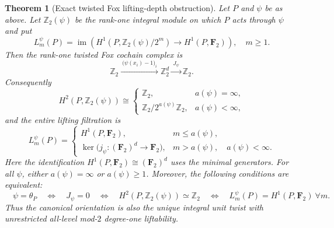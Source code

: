 \documentclass[11pt]{article}
\newtheorem{theorem}{Theorem}[section]
\theoremstyle{definition}
\begin{document}
\begin{theorem}[Exact twisted Fox lifting-depth obstruction]
\label{thm:dyadic-twisted-fox-lifting-depth}
Let $P$ and $\psi$ be as above.  Let
$\mathbb Z_2(\psi)$ be the rank-one integral module
on which $P$ acts through $\psi$ and put
\begin{equation}\label{eq:dyadic-psi-lifting-def}
L_m^\psi(P)=
\operatorname{im}\left(
H^1(P,\mathbb Z_2(\psi)/2^m)
\longrightarrow H^1(P,\mathbf F_2)\right),
\quad m\ge1.
\end{equation}
Then the rank-one twisted Fox cochain complex is
\begin{equation}\label{eq:dyadic-psi-three-term-fox}
\mathbb Z_2
\xrightarrow{\ \bigl(\psi(x_i)-1\bigr)_i\ }
\mathbb Z_2^d
\xrightarrow{\ J_\psi\ }
\mathbb Z_2.
\end{equation}
Consequently
\begin{equation}\label{eq:dyadic-psi-h2}
H^2(P,\mathbb Z_2(\psi))
\cong
\begin{cases}
\mathbb Z_2,&a(\psi)=\infty,\\
\mathbb Z_2/2^{a(\psi)}\mathbb Z_2,
  &a(\psi)<\infty,
\end{cases}
\end{equation}
and the entire lifting filtration is
\begin{equation}\label{eq:dyadic-psi-lifting-formula}
L_m^\psi(P)=
\begin{cases}
H^1(P,\mathbf F_2),
 &m\le a(\psi),\\
\ker\bigl(j_\psi:(\mathbf F_2)^d\to\mathbf F_2\bigr),
 &m>a(\psi),\quad a(\psi)<\infty.
\end{cases}
\end{equation}
Here the identification $H^1(P,\mathbf F_2)
\cong(\mathbf F_2)^d$ uses the minimal generators.
For all $\psi$, either $a(\psi)=\infty$ or
$a(\psi)\ge1$.  Moreover, the following conditions
are equivalent:
\begin{equation}\label{eq:dyadic-psi-orientation-criterion}
\boxed{\quad
\psi=\theta_P
\quad\Longleftrightarrow\quad
J_\psi=0
\quad\Longleftrightarrow\quad
H^2(P,\mathbb Z_2(\psi))\simeq\mathbb Z_2
\quad\Longleftrightarrow\quad
L_m^\psi(P)=H^1(P,\mathbf F_2)\ \forall m.
\quad}
\end{equation}
Thus the canonical orientation is also the unique
integral unit twist with \emph{unrestricted all-level
mod-$2$ degree-one liftability}.
\end{theorem}
\end{document}
